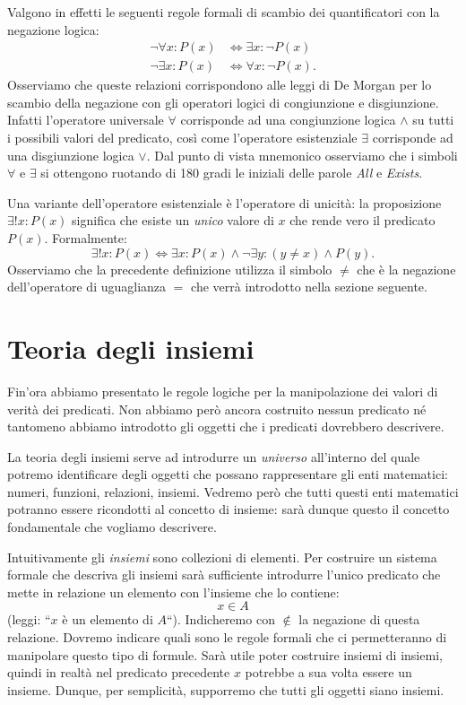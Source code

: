 \documentclass[italian,a4paper,hidelinks,headinclude]{scrartcl}
\newcommand{\myemph}[1]{\emph{#1}\marginpar{#1}}
\begin{document}
Valgono in effetti le seguenti regole formali di scambio dei quantificatori con
la negazione logica:
\begin{align*}
  \neg \forall x \colon P(x) &\iff \exists x \colon \neg P(x)\\
  \neg \exists x \colon P(x) &\iff \forall x \colon \neg P(x).
\end{align*}
Osserviamo che queste relazioni corrispondono alle leggi di De Morgan per lo
scambio della negazione con gli operatori logici di congiunzione e disgiunzione.
Infatti l'operatore universale $\forall$ corrisponde ad una congiunzione logica
$\wedge$ su tutti i possibili valori del predicato,
così come l'operatore esistenziale
$\exists$ corrisponde ad una disgiunzione logica $\vee$.
Dal punto di vista mnemonico osserviamo che i simboli $\forall$ e $\exists$
si ottengono ruotando di 180 gradi le iniziali delle parole \emph{All} e \emph{Exists}.

Una variante dell'operatore esistenziale è l'operatore di unicità:
la proposizione $\exists! x\colon P(x)$ significa che esiste un \emph{unico} valore di $x$
che rende vero il predicato $P(x)$. Formalmente:
\[
  \exists!x\colon P(x) \iff \exists x\colon P(x)
  \wedge \neg \exists y\colon (y \neq x) \wedge P(y).
\]
Osserviamo che la precedente definizione utilizza il simbolo $\neq$ che è la
negazione dell'operatore di uguaglianza $=$ che verrà introdotto nella sezione
seguente.

\section{Teoria degli insiemi}

Fin'ora abbiamo presentato le regole logiche per la manipolazione dei valori di
verità dei predicati. Non abbiamo però ancora costruito nessun predicato né
tantomeno abbiamo introdotto gli oggetti che i predicati dovrebbero descrivere.

La teoria degli insiemi serve ad introdurre un \emph{universo} all'interno del
quale potremo identificare degli oggetti che possano rappresentare gli enti
matematici: numeri, funzioni, relazioni, insiemi.
Vedremo però che tutti questi enti matematici potranno essere ricondotti al
concetto di insieme: sarà dunque questo il concetto fondamentale che vogliamo
descrivere.

Intuitivamente gli \myemph{insiemi} sono collezioni di elementi.
Per costruire un sistema formale che descriva gli insiemi sarà sufficiente
introdurre l'unico predicato che mette in relazione un elemento con l'insieme
che lo contiene:
\[
  x \in A
\]
(leggi: ``$x$ è un elemento di $A$``).
Indicheremo con $\not \in$ la negazione
di questa relazione.
Dovremo indicare quali sono le regole formali che ci permetteranno di manipolare
questo tipo di formule.
Sarà utile poter costruire insiemi di insiemi, quindi in realtà nel predicato precedente
$x$ potrebbe a sua volta essere un insieme. Dunque, per semplicità, supporremo
che tutti gli oggetti siano insiemi.
\end{document}
